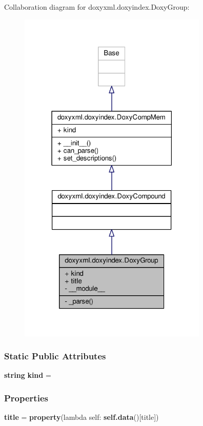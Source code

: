 Collaboration diagram for doxyxml.\+doxyindex.\+Doxy\+Group\+:
\nopagebreak
\begin{figure}[H]
\begin{center}
\leavevmode
\includegraphics[width=255pt]{d1/d66/classdoxyxml_1_1doxyindex_1_1DoxyGroup__coll__graph}
\end{center}
\end{figure}
\subsubsection*{Static Public Attributes}
\begin{DoxyCompactItemize}
\item 
{\bf string} {\bf kind} = \textquotesingle{}
\end{DoxyCompactItemize}
\subsubsection*{Properties}
\begin{DoxyCompactItemize}
\item 
{\bf title} = {\bf property}(lambda self\+: {\bf self.\+data}()[\textquotesingle{}title\textquotesingle{}])
\end{DoxyCompactItemize}
